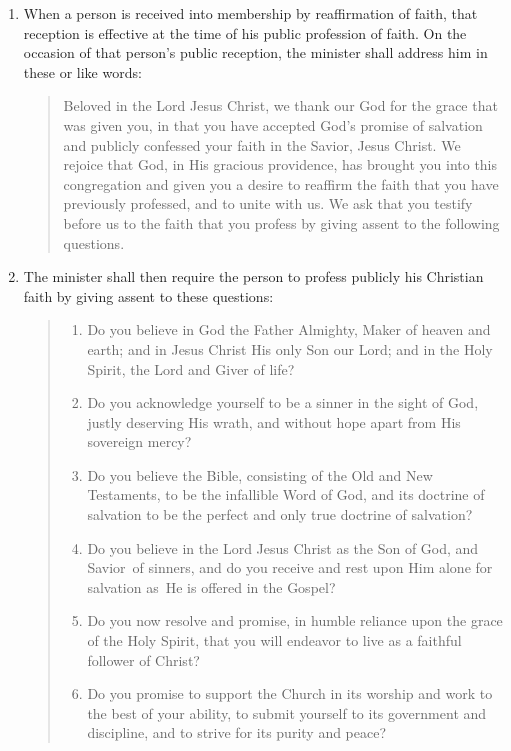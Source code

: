 \documentclass[
]{book}
\providecommand{\tightlist}{%
  \setlength{\itemsep}{0pt}\setlength{\parskip}{0pt}}
\begin{document}
\protect\hypertarget{chapter-slug-65-reception-by-reaffirmation-of-faith}{\href{}{}}

\begin{enumerate}
\def\labelenumi{\arabic{enumi}.}
\item
  \protect\hypertarget{65}{\href{}{}}When a person is received into membership by reaffirmation of faith, that reception is effective at the time of his public profession of faith. On the occasion of that person's public reception, the minister shall address him in these or like words:

  \begin{quote}
  Beloved in the Lord Jesus Christ, we thank our God for the grace that was given you, in that you have accepted God's promise of salvation and publicly confessed your faith in the Savior, Jesus Christ. We rejoice that God, in His gracious providence, has brought you into this congregation and given you a desire to reaffirm the faith that you have previously professed, and to unite with us. We ask that you testify before us to the faith that you profess by giving assent to the following questions.
  \end{quote}
\item
  The minister shall then require the person to profess publicly his Christian faith by giving assent to these questions:

  \begin{quote}
  \begin{enumerate}
  \def\labelenumii{(\arabic{enumii})}
  \tightlist
  \item
    Do you believe in God the Father Almighty, Maker of heaven and earth; and in Jesus Christ His only Son our Lord; and in the Holy Spirit, the Lord and Giver of life?
  \item
    Do you acknowledge yourself to be a sinner in the sight of God, justly deserving His wrath, and without hope apart from His sovereign mercy?
  \item
    Do you believe the Bible, consisting of the Old and New Testaments, to be the infallible Word of God, and its doctrine of salvation to be the perfect and only true doctrine of salvation?
  \item
    Do you believe in the Lord Jesus Christ as the Son of God, and Savior~of sinners, and do you receive and rest upon Him alone for salvation as~He is offered in the Gospel?
  \item
    Do you now resolve and promise, in humble reliance upon the grace of the Holy Spirit, that you will endeavor to live as a faithful follower of Christ?
  \item
    Do you promise to support the Church in its worship and work to the best of your ability, to submit yourself to its government and discipline, and to strive for its purity and peace?
  \end{enumerate}
  \end{quote}


\end{enumerate}
\end{document}
